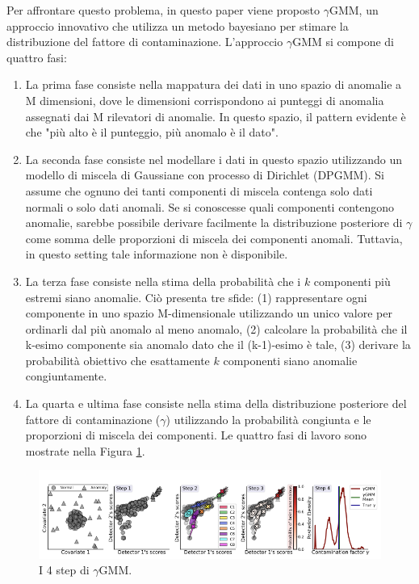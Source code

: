 Per affrontare questo problema, in questo paper viene proposto $\gamma$GMM, un approccio innovativo che utilizza un metodo bayesiano per stimare la distribuzione del fattore di contaminazione.
L'approccio $\gamma$GMM si compone di quattro fasi:
\begin{enumerate}
\item La prima fase consiste nella mappatura dei dati in uno spazio di anomalie a M dimensioni, dove le dimensioni corrispondono ai punteggi di anomalia assegnati dai M rilevatori di anomalie. In questo spazio, il pattern evidente è che "più alto è il punteggio, più anomalo è il dato".
\item La seconda fase consiste nel modellare i dati in questo spazio utilizzando un modello di miscela di Gaussiane con processo di Dirichlet (DPGMM). Si assume che ognuno dei tanti componenti di miscela contenga solo dati normali o solo dati anomali. Se si conoscesse quali componenti contengono anomalie, sarebbe possibile derivare facilmente la distribuzione posteriore di $\gamma$ come somma delle proporzioni di miscela dei componenti anomali. Tuttavia, in questo setting tale informazione non è disponibile.
\item La terza fase consiste nella stima della probabilità che i $k$ componenti più estremi siano anomalie. Ciò presenta tre sfide: (1) rappresentare ogni componente in uno spazio M-dimensionale utilizzando un unico valore per ordinarli dal più anomalo al meno anomalo, (2) calcolare la probabilità che il k-esimo componente sia anomalo dato che il (k-1)-esimo è tale, (3) derivare la probabilità obiettivo che esattamente $k$ componenti siano anomalie congiuntamente.
\item La quarta e ultima fase consiste nella stima della distribuzione posteriore del fattore di contaminazione ($\gamma$) utilizzando la probabilità congiunta e le proporzioni di miscela dei componenti.
Le quattro fasi di lavoro sono mostrate nella Figura \ref{ygmm1}.

\end{enumerate}
\begin{figure}[t]
	\centering
	\includegraphics[width=14cm, scale=1]{images/ygmm1}
	\caption{I 4 step di $\gamma$GMM.}
	\label{ygmm1}
\end{figure}

